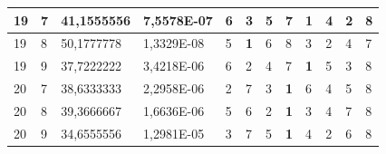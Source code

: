 \documentclass[conference]{IEEEtran}
\begin{document}
\begin{table}[]
\begin{tabular}{|llll|llllllll|}
		\multicolumn{1}{|l|}{19}  & \multicolumn{1}{l|}{7}         & \multicolumn{1}{l|}{41,1555556}    & 7,5578E-07 & \multicolumn{1}{l|}{6}   & \multicolumn{1}{l|}{3}          & \multicolumn{1}{l|}{5}          & \multicolumn{1}{l|}{7}          & \multicolumn{1}{l|}{\textbf{1}} & \multicolumn{1}{l|}{4}          & \multicolumn{1}{l|}{2}   & 8                      \\ \hline
		\multicolumn{1}{|l|}{19}  & \multicolumn{1}{l|}{8}         & \multicolumn{1}{l|}{50,1777778}    & 1,3329E-08 & \multicolumn{1}{l|}{5}   & \multicolumn{1}{l|}{\textbf{1}} & \multicolumn{1}{l|}{6}          & \multicolumn{1}{l|}{8}          & \multicolumn{1}{l|}{3}          & \multicolumn{1}{l|}{2}          & \multicolumn{1}{l|}{4}   & 7                      \\ \hline
		\multicolumn{1}{|l|}{19}  & \multicolumn{1}{l|}{9}         & \multicolumn{1}{l|}{37,7222222}    & 3,4218E-06 & \multicolumn{1}{l|}{6}   & \multicolumn{1}{l|}{2}          & \multicolumn{1}{l|}{4}          & \multicolumn{1}{l|}{7}          & \multicolumn{1}{l|}{\textbf{1}} & \multicolumn{1}{l|}{5}          & \multicolumn{1}{l|}{3}   & 8                      \\ \hline
		\multicolumn{1}{|l|}{20}  & \multicolumn{1}{l|}{7}         & \multicolumn{1}{l|}{38,6333333}    & 2,2958E-06 & \multicolumn{1}{l|}{2}   & \multicolumn{1}{l|}{7}          & \multicolumn{1}{l|}{3}          & \multicolumn{1}{l|}{\textbf{1}} & \multicolumn{1}{l|}{6}          & \multicolumn{1}{l|}{4}          & \multicolumn{1}{l|}{5}   & 8                      \\ \hline
		\multicolumn{1}{|l|}{20}  & \multicolumn{1}{l|}{8}         & \multicolumn{1}{l|}{39,3666667}    & 1,6636E-06 & \multicolumn{1}{l|}{5}   & \multicolumn{1}{l|}{6}          & \multicolumn{1}{l|}{2}          & \multicolumn{1}{l|}{\textbf{1}} & \multicolumn{1}{l|}{3}          & \multicolumn{1}{l|}{4}          & \multicolumn{1}{l|}{7}   & 8                      \\ \hline
		\multicolumn{1}{|l|}{20}  & \multicolumn{1}{l|}{9}         & \multicolumn{1}{l|}{34,6555556}    & 1,2981E-05 & \multicolumn{1}{l|}{3}   & \multicolumn{1}{l|}{7}          & \multicolumn{1}{l|}{5}          & \multicolumn{1}{l|}{\textbf{1}} & \multicolumn{1}{l|}{4}          & \multicolumn{1}{l|}{2}          & \multicolumn{1}{l|}{6}   & 8                      \\ \hline
	\end{tabular}
\end{table}
\end{document}

